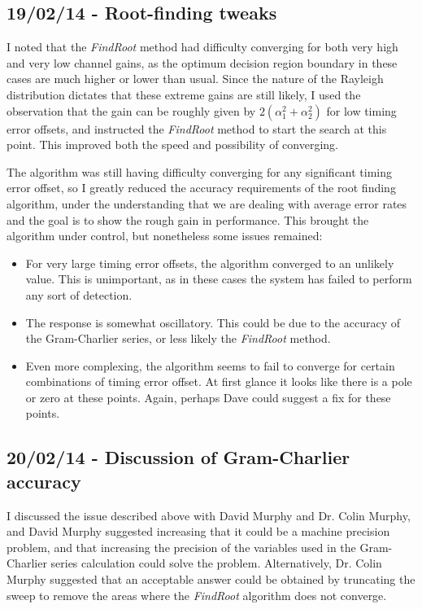 \subsection{19/02/14 - Root-finding tweaks}

I noted that the \emph{FindRoot} method had difficulty converging for
both very high and very low channel gains, as the optimum decision
region boundary in these cases are much higher or lower than usual.
Since the nature of the Rayleigh distribution dictates that these
extreme gains are still likely, I used the observation that the gain can
be roughly given by $2(\alpha_1^2 + \alpha_2^2)$ for low timing error
offsets, and instructed the \emph{FindRoot} method to start the search
at this point. This improved both the speed and possibility of
converging.

The algorithm was still having difficulty converging for any significant
timing error offset, so I greatly reduced the accuracy requirements of
the root finding algorithm, under the understanding that we are dealing
with average error rates and the goal is to show the rough gain in
performance. This brought the algorithm under control, but nonetheless
some issues remained:

\begin{itemize}
\itemsep1pt\parskip0pt
\item
  For very large timing error offsets, the algorithm converged to an
  unlikely value. This is unimportant, as in these cases the system has
  failed to perform any sort of detection.
\item
  The response is somewhat oscillatory. This could be due to the
  accuracy of the Gram-Charlier series, or less likely the
  \emph{FindRoot} method.
\item
  Even more complexing, the algorithm seems to fail to converge for
  certain combinations of timing error offset. At first glance it looks
  like there is a pole or zero at these points. Again, perhaps Dave
  could suggest a fix for these points.
\end{itemize}

\subsection{20/02/14 - Discussion of Gram-Charlier accuracy}

I discussed the issue described above with David Murphy and Dr. Colin Murphy, and David Murphy
suggested increasing that it could be a machine precision problem, and
that increasing the precision of the variables used in the Gram-Charlier
series calculation could solve the problem. Alternatively, Dr. Colin Murphy
suggested that an acceptable answer could be obtained by truncating the
sweep to remove the areas where the \emph{FindRoot} algorithm does not
converge.

